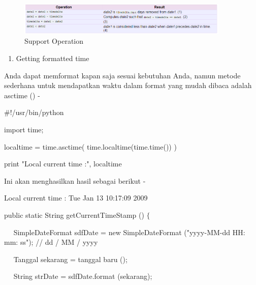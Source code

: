 \begin{figure}[ht]
	\centerline{\includegraphics[width=0.90\textwidth]{figures/DateTime2}}
	\caption{Support Operation}
	\label{Support Opperation}
\end{figure}

\vspace{\baselineskip}
\noindent 
\begin{enumerate}
	\item Getting formatted time \par
\end{enumerate}
\noindent 
Anda dapat memformat kapan saja sesuai kebutuhan Anda, namun metode sederhana untuk mendapatkan waktu dalam format yang mudah dibaca adalah asctime () - \par
\noindent 
 \hspace*{0.5in}  $  \#  $!/usr/bin/python \par
\noindent 
 \hspace*{0.5in} import time; \par
\vspace{12pt}
\noindent 
 \hspace*{0.5in} localtime = time.asctime( time.localtime(time.time()) ) \par
\noindent 
 \hspace*{0.5in} print "Local current time :", localtime \par
\vspace{12pt}
\noindent 
Ini akan menghasilkan hasil sebagai berikut - \par
\noindent 
 \hspace*{0.5in} Local current time : Tue Jan 13 10:17:09 2009 \par
\vspace{12pt}
\vspace{12pt}
\noindent 
public static String getCurrentTimeStamp ()  $  \{  $ \par
\noindent 
 $  $ $  $ $  $ $  $ SimpleDateFormat sdfDate = new SimpleDateFormat ("yyyy-MM-dd HH: mm: ss"); // dd / MM / yyyy \par
\noindent 
 $  $ $  $ $  $ $  $ Tanggal sekarang = tanggal baru (); \par
\noindent 
 $  $ $  $ $  $ $  $ String strDate = sdfDate.format (sekarang); \par
